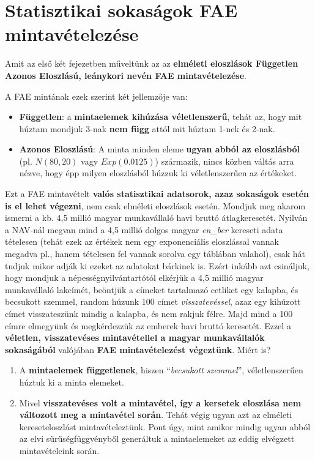 \documentclass[
]{book}
\providecommand{\tightlist}{%
  \setlength{\itemsep}{0pt}\setlength{\parskip}{0pt}}
\begin{document}
\section{Statisztikai sokaságok FAE mintavételezése}\label{statisztikai-sokasuxe1gok-fae-mintavuxe9telezuxe9se}

Amit az első két fejezetben műveltünk az az \textbf{elméleti eloszlások Független Azonos Eloszlású, leánykori nevén FAE mintavételezése}.

A FAE mintának ezek szerint két jellemzője van:

\begin{itemize}
\tightlist
\item
  \textbf{Független}: a \textbf{mintaelemek kihúzása véletlenszerű}, tehát az, hogy mit húztam mondjuk 3-nak \textbf{nem függ} attól mit húztam 1-nek és 2-nak.
\item
  \textbf{Azonos Eloszlású}: A minta minden eleme \textbf{ugyan abból az eloszlásból} (pl. \(N(80,20)\) vagy \(Exp(0.0125)\)) származik, nincs közben váltás arra nézve, hogy épp milyen eloszlásból húzzuk ki véletlenszerűen az értékeket.
\end{itemize}

Ezt a FAE mintavételt \textbf{valós statisztikai adatsorok, azaz sokaságok esetén is el lehet végezni}, nem csak elméleti eloszlások esetén.
Mondjuk meg akarom ismerni a kb. 4,5 millió magyar munkavállaló havi bruttó átlagkeresetét. Nyilván a NAV-nál megvan mind a 4,5 millió dolgos magyar \emph{en\_ber} kereseti adata tételesen (tehát ezek az értékek nem egy exponenciális eloszlással vannak megadva pl., hanem tételesen fel vannak sorolva egy táblában valahol), csak hát tudjuk mikor adják ki ezeket az adatokat bárkinek is. Ezért inkább azt csináljuk, hogy mondjuk a népességnyilvántartótól elkérjük a 4,5 millió magyar munkavállaló lakcímét, beöntjük a címeket tartalmazó cetliket egy kalapba, és becsukott szemmel, random húzunk 100 címet \emph{visszatevéssel}, azaz egy kihúzott címet visszateszünk mindig a kalapba, és nem rakjuk félre. Majd mind a 100 címre elmegyünk és megkérdezzük az emberek havi bruttó keresetét. Ezzel a \textbf{véletlen, visszatevéses mintavétellel a magyar munkavállalók sokaságából} valójában \textbf{FAE mintavételezést végeztünk}. Miért is?

\begin{enumerate}
\def\labelenumi{\arabic{enumi}.}
\tightlist
\item
  A \textbf{mintaelemek függetlenek}, hiszen ``\emph{becsukott szemmel}'', véletlenszerűen húztuk ki a minta elemeket.
\item
  Mivel \textbf{visszatevéses volt a mintavétel, így a kersetek eloszlása nem változott meg a mintavétel során}. Tehát végig ugyan azt az elméleti kereseteloszlást mintavételeztünk. Pont úgy, mint amikor mindig ugyan abból az elvi sűrűségfüggvényből generáltuk a mintaelemeket az eddig elvégzett mintavételeink során.
\end{enumerate}
\end{document}
